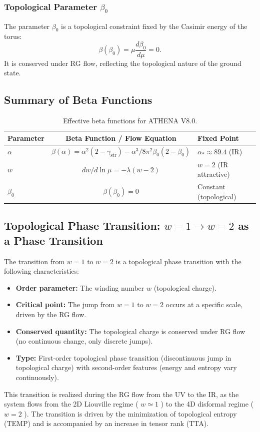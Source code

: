 \documentclass[11pt,a4paper]{article}
\begin{document}
\subsubsection{Topological Parameter \(\beta_{0}\)}
The parameter \(\beta_{0}\) is a topological constraint fixed by the Casimir energy of the torus:
\begin{equation}
\beta (\beta_{0}) = \mu \frac{d\beta_{0}}{d\mu} = 0. \tag{64}
\end{equation}
It is conserved under RG flow, reflecting the topological nature of the ground state.

\subsection{Summary of Beta Functions}
\begin{table}[H]
\centering
\caption{Effective beta functions for ATHENA V8.0.}
\begin{tabular}{lcl}
\toprule
Parameter & Beta Function / Flow Equation & Fixed Point \\
\midrule
\(\alpha\) & \(\beta(\alpha) = \alpha^2(2 - \gamma_{\text{str}}) - \alpha^3/8\pi^2 \beta_0(2-\beta_0)\) & \(\alpha_* \approx 89.4\) (IR) \\
\(w\) & \(dw/d\ln\mu = -\lambda(w - 2)\) & \(w = 2\) (IR attractive) \\
\(\beta_0\) & \(\beta(\beta_0) = 0\) & Constant (topological) \\
\bottomrule
\end{tabular}
\end{table}

\subsection{Topological Phase Transition: \(w = 1 \to w = 2\) as a Phase Transition}
The transition from \(w = 1\) to \(w = 2\) is a topological phase transition with the following characteristics:
\begin{itemize}
\item \textbf{Order parameter:} The winding number \(w\) (topological charge).
\item \textbf{Critical point:} The jump from \(w = 1\) to \(w = 2\) occurs at a specific scale, driven by the RG flow.
\item \textbf{Conserved quantity:} The topological charge is conserved under RG flow (no continuous change, only discrete jumps).
\item \textbf{Type:} First-order topological phase transition (discontinuous jump in topological charge) with second-order features (energy and entropy vary continuously).
\end{itemize}
This transition is realized during the RG flow from the UV to the IR, as the system flows from the 2D Liouville regime ( \(w \simeq 1\) ) to the 4D disformal regime ( \(w = 2\) ). The transition is driven by the minimization of topological entropy (TEMP) and is accompanied by an increase in tensor rank (TTA).
\end{document}
